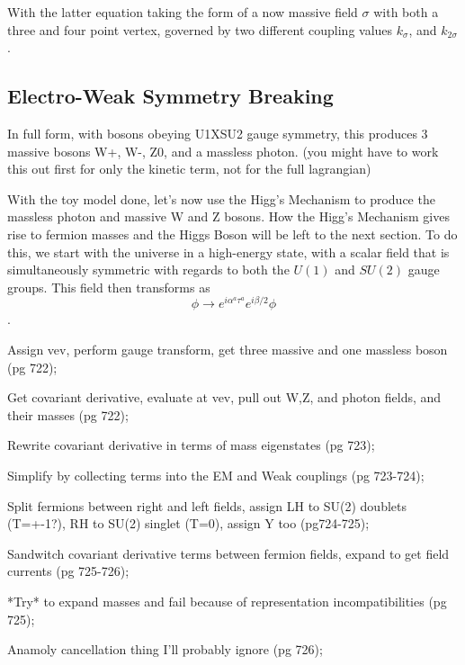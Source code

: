         With the latter equation taking the form of a now massive field $\sigma$ with both a three and four point vertex,
            governed by two different coupling values $k_{\sigma}$, and $k_{2\sigma}$.

        \cite{Halzen_book}

        

    \subsection{Electro-Weak Symmetry Breaking}
        In full form, with bosons obeying U1XSU2 gauge symmetry, this produces 3 massive bosons W+, W-, Z0, and a massless photon.
            (you might have to work this out first for only the kinetic term, not for the full lagrangian)

        With the toy model done, let's now use the Higg's Mechanism to produce the massless photon and massive W and Z bosons.
        How the Higg's Mechanism gives rise to fermion masses and the Higgs Boson will be left to the next section.
        To do this, we start with the universe in a high-energy state,
            with a scalar field that is simultaneously symmetric with regards to both the $U(1)$ and $SU(2)$ gauge groups.
        This field then transforms as
        \begin{equation}
            \phi \rightarrow e^{i \alpha^a \tau^a} e^{i \beta/2 } \phi
        \end{equation}.

        Assign vev, perform gauge transform, get three massive and one massless boson (pg 722);

        Get covariant derivative, evaluate at vev, pull out W,Z, and photon fields, and their masses (pg 722);

        Rewrite covariant derivative in terms of mass eigenstates (pg 723);

        Simplify by collecting terms into the EM and Weak couplings (pg 723-724);

        Split fermions between right and left fields, assign LH to SU(2) doublets (T=+-1?), RH to SU(2) singlet (T=0), assign Y too (pg724-725);

        Sandwitch covariant derivative terms between fermion fields, expand to get field currents (pg 725-726);

        *Try* to expand masses and fail because of representation incompatibilities (pg 725);

        Anamoly cancellation thing I'll probably ignore (pg 726);

